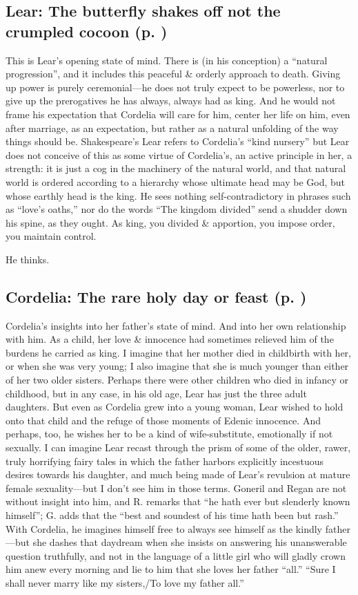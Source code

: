 \subsection*{Lear: The butterfly shakes off not the crumpled cocoon (p. \pageref{ch:lear_aa})}
This is Lear's opening state of mind. There is (in his conception) a ``natural progression'', and it includes this peaceful \& orderly approach to death. Giving up power is purely ceremonial---he does not truly expect to be powerless, nor to give up the prerogatives he has always, always had as king. And he would not frame his expectation that Cordelia will care for him, center her life on him, even after marriage, as an expectation, but rather as a natural unfolding of the way things should be. Shakespeare's Lear refers to Cordelia's ``kind nursery'' but Lear does not conceive of this as some virtue of Cordelia's, an active principle in her, a strength: it is just a cog in the machinery of the natural world, and that natural world is ordered according to a hierarchy whose ultimate head may be God, but whose earthly head is the king. He sees nothing self-contradictory in phrases such as ``love's oaths,'' nor do the words ``The kingdom divided'' send a shudder down his spine, as they ought. As king, you divided \& apportion, you impose order, you maintain control.

He thinks.

\subsection*{Cordelia: The rare holy day or feast (p. \pageref{ch:lear_ab})}
Cordelia's insights into her father's state of mind. And into her own relationship with him. As a child, her love \& innocence had sometimes relieved him of the burdens he carried as king. I imagine that her mother died in childbirth with her, or when she was very young; I also imagine that she is much younger than either of her two older sisters. Perhaps there were other children who died in infancy or childhood, but in any case, in his old age, Lear has just the three adult daughters. But even as Cordelia grew into a young woman, Lear wished to hold onto that child and the refuge of those moments of Edenic innocence. And perhaps, too, he wishes her to be a kind of wife-substitute, emotionally if not sexually. I can imagine Lear recast through the prism of some of the older, rawer, truly horrifying fairy tales in which the father harbors explicitly incestuous desires towards his daughter, and much being made of Lear's revulsion at mature female sexuality---but I don't see him in those terms. Goneril and Regan are not without insight into him, and R. remarks that ``he hath ever but slenderly known himself''; G. adds that the ``best and soundest of his time hath been but rash.'' With Cordelia, he imagines himself free to always see himself as the kindly father---but she dashes that daydream when she insists on answering his unanswerable question truthfully, and not in the language of a little girl who will gladly crown him anew every morning and lie to him that she loves her father ``all.'' ``Sure I shall never marry like my sisters,/To love my father all.''

